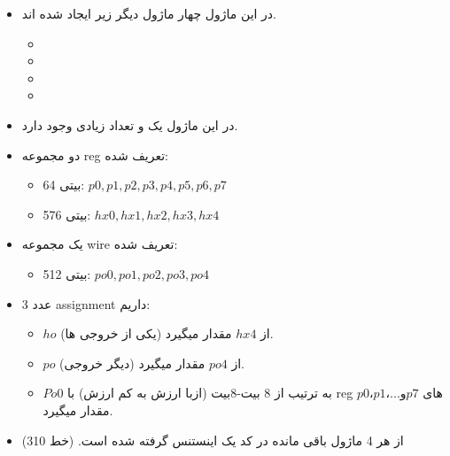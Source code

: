 \begin{itemize}
\item
در این ماژول چهار ماژول دیگر زیر ایجاد شده اند. 
\begin{itemize}
\item
{}
\item
{}
\item
{}
\item
{}
\end{itemize}
\item
در این ماژول یک 
و تعداد زیادی 
وجود دارد.
\item
دو مجموعه reg تعریف شده:
\begin{itemize}
\item
64 بیتی: $p0, p1, p2, p3, p4, p5, p6, p7$
\item
576 بیتی: $hx0, hx1, hx2, hx3, hx4$
\end{itemize}
\item
یک مجموعه wire تعریف شده:
\begin{itemize}
\item
512 بیتی: $po0, po1, po2, po3, po4$
\end{itemize}
\item
3 عدد assignment داریم:
\begin{itemize}
\item
 $ho$ (یکی از خروجی ها) از $hx4$ مقدار میگیرد. 
 \item
$po$ (دیگر خروجی) از $po4$ مقدار میگیرد. 
\item
$Po0$ به ترتیب از 8 بیت-8بیت (ازبا  ارزش به کم ارزش) با reg های $p0، p1، ... و p7$ مقدار میگیرد.
\end{itemize}
\item
از هر 4 ماژول باقی مانده
 در کد یک اینستنس گرفته شده است. (خط 310)
 

\end{itemize}
